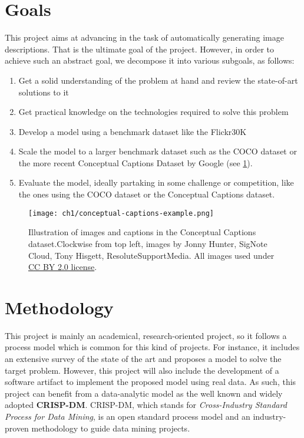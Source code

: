 \section{Goals}

This project aims at advancing in the task of automatically generating image descriptions. That is the ultimate goal of the project. However, in order to achieve such an abstract goal, we decompose it into various subgoals, as follows:

\begin{enumerate}
\item Get a solid understanding of the problem at hand and review the state-of-art solutions to it
\item Get practical knowledge on the technologies required to solve this problem
\item Develop a model using a benchmark dataset like the Flickr30K
\item Scale the model to a larger benchmark dataset such as the COCO\cite{Lin2014} dataset or the more recent Conceptual Captions Dataset by Google \cite{Sharma2018}  (see \cref{fig:conceptual-captions}).
\item Evaluate the model, ideally partaking in some challenge or competition, like the ones using the COCO dataset or the Conceptual Captions dataset.
\end{enumerate}

\begin{figure}[hpt]
    \centering
    \texttt{[image: ch1/conceptual-captions-example.png]}
    \caption{Illustration of images and captions in the Conceptual Captions dataset.Clockwise from top left, images by Jonny Hunter, SigNote Cloud, Tony Hisgett, ResoluteSupportMedia. All images used under \href{https://creativecommons.org/licenses/by/2.0/}{CC BY 2.0 license}.}
    \label{fig:conceptual-captions}
\end{figure}

\section{Methodology}

This project is mainly an academical, research-oriented project, so it  follows a process model which is common for this kind of projects. For instance, it includes an extensive survey of the state of the art and proposes a model to solve the target problem. However, this project will also include the development of a software artifact to implement the proposed model using real data. As such, this project can benefit from a data-analytic model as the well known and widely adopted \textbf{CRISP-DM}. CRISP-DM, which stands for \textit{Cross-Industry Standard Process for Data Mining}, is an open standard process model and an industry-proven methodology to guide data mining projects.

